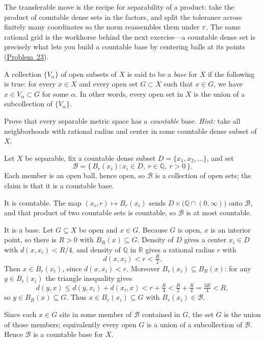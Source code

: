 \documentclass[main.tex]{subfiles}
\begin{document}
\begin{Reflection}
The transferable move is the recipe for separability of a product: take the product of countable dense
sets in the factors, and split the tolerance across finitely many coordinates so the norm reassembles them
under $\varepsilon$. The same rational grid is the workhorse behind the next exercise---a countable dense set is
precisely what lets you build a countable base by centering balls at its points (\hyperlink{prob:23}{Problem~23}).
\end{Reflection}

A collection $\{V_{\alpha}\}$ of open subsets of $X$ is said to be a \emph{base} for $X$ if the
following is true: for every $x\in X$ and every open set $G\subset X$ such that $x\in G$, we have
$x\in V_{\alpha}\subset G$ for some $\alpha$. In other words, every open set in $X$ is the union of a
subcollection of $\{V_{\alpha}\}$.

Prove that every separable metric space has a \emph{countable} base. \emph{Hint:} take all
neighborhoods with rational radius and center in some countable dense subset of $X$.

\begin{Solution}
Let $X$ be separable, fix a countable dense subset $D=\{x_1,x_2,\dots\}$, and set
\[
  \mathcal B=\bigl\{\,B_r(x_i):x_i\in D,\ r\in\mathbb Q,\ r>0\,\bigr\}.
\]
Each member is an open ball, hence open, so $\mathcal B$ is a collection of open sets; the claim is
that it is a countable base.

It is countable. The map $(x_i,r)\mapsto B_r(x_i)$ sends $D\times\bigl(\mathbb Q\cap(0,\infty)\bigr)$
onto $\mathcal B$, and that product of two countable sets is countable, so $\mathcal B$ is at most
countable.

It is a base. Let $G\subseteq X$ be open and $x\in G$. Because $G$ is open, $x$ is an interior point,
so there is $R>0$ with $B_R(x)\subseteq G$. Density of $D$ gives a center $x_i\in D$ with
$d(x,x_i)<R/4$, and density of $\mathbb Q$ in $\mathbb R$ gives a rational radius $r$ with
\[
  d(x,x_i)<r<\tfrac R2 .
\]
Then $x\in B_r(x_i)$, since $d(x,x_i)<r$. Moreover $B_r(x_i)\subseteq B_R(x)$: for any $y\in
B_r(x_i)$ the triangle inequality gives
\[
  d(y,x)\le d(y,x_i)+d(x_i,x)<r+\tfrac R4<\tfrac R2+\tfrac R4=\tfrac{3R}{4}<R,
\]
so $y\in B_R(x)\subseteq G$. Thus $x\in B_r(x_i)\subseteq G$ with $B_r(x_i)\in\mathcal B$.

Since each $x\in G$ sits in some member of $\mathcal B$ contained in $G$, the set $G$ is the union of
those members; equivalently every open $G$ is a union of a subcollection of $\mathcal B$. Hence
$\mathcal B$ is a countable base for $X$.
\end{Solution}
\end{document}
